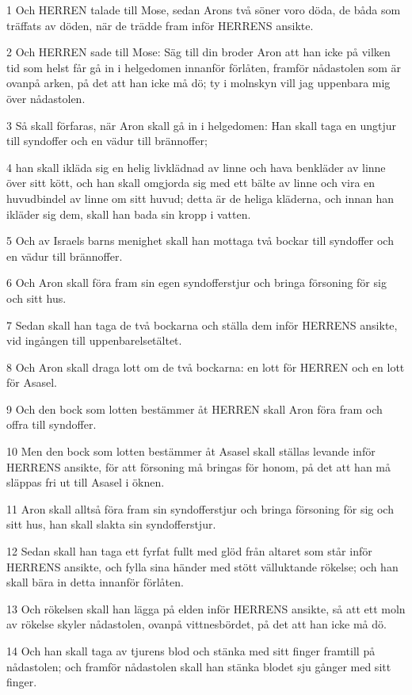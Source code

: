 \par 1 Och HERREN talade till Mose, sedan Arons två söner voro döda, de båda som träffats av döden, när de trädde fram inför HERRENS ansikte.
\par 2 Och HERREN sade till Mose: Säg till din broder Aron att han icke på vilken tid som helst får gå in i helgedomen innanför förlåten, framför nådastolen som är ovanpå arken, på det att han icke må dö; ty i molnskyn vill jag uppenbara mig över nådastolen.
\par 3 Så skall förfaras, när Aron skall gå in i helgedomen: Han skall taga en ungtjur till syndoffer och en vädur till brännoffer;
\par 4 han skall ikläda sig en helig livklädnad av linne och hava benkläder av linne över sitt kött, och han skall omgjorda sig med ett bälte av linne och vira en huvudbindel av linne om sitt huvud; detta är de heliga kläderna, och innan han ikläder sig dem, skall han bada sin kropp i vatten.
\par 5 Och av Israels barns menighet skall han mottaga två bockar till syndoffer och en vädur till brännoffer.
\par 6 Och Aron skall föra fram sin egen syndofferstjur och bringa försoning för sig och sitt hus.
\par 7 Sedan skall han taga de två bockarna och ställa dem inför HERRENS ansikte, vid ingången till uppenbarelsetältet.
\par 8 Och Aron skall draga lott om de två bockarna: en lott för HERREN och en lott för Asasel.
\par 9 Och den bock som lotten bestämmer åt HERREN skall Aron föra fram och offra till syndoffer.
\par 10 Men den bock som lotten bestämmer åt Asasel skall ställas levande inför HERRENS ansikte, för att försoning må bringas för honom, på det att han må släppas fri ut till Asasel i öknen.
\par 11 Aron skall alltså föra fram sin syndofferstjur och bringa försoning för sig och sitt hus, han skall slakta sin syndofferstjur.
\par 12 Sedan skall han taga ett fyrfat fullt med glöd från altaret som står inför HERRENS ansikte, och fylla sina händer med stött välluktande rökelse; och han skall bära in detta innanför förlåten.
\par 13 Och rökelsen skall han lägga på elden inför HERRENS ansikte, så att ett moln av rökelse skyler nådastolen, ovanpå vittnesbördet, på det att han icke må dö.
\par 14 Och han skall taga av tjurens blod och stänka med sitt finger framtill på nådastolen; och framför nådastolen skall han stänka blodet sju gånger med sitt finger.
